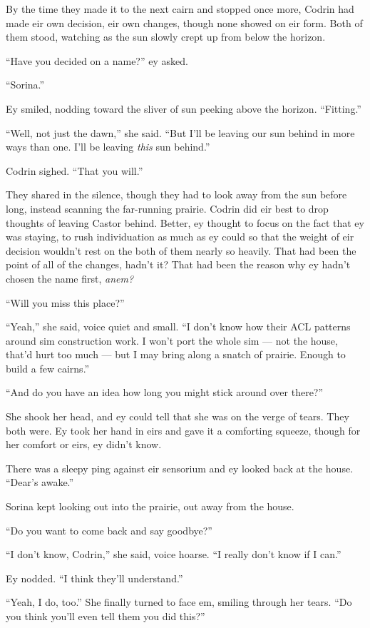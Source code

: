 By the time they made it to the next cairn and stopped once more, Codrin had made eir own decision, eir own changes, though none showed on eir form. Both of them stood, watching as the sun slowly crept up from below the horizon.

``Have you decided on a name?'' ey asked.

``Sorina.''

Ey smiled, nodding toward the sliver of sun peeking above the horizon. ``Fitting.''

``Well, not just the dawn,'' she said. ``But I'll be leaving our sun behind in more ways than one. I'll be leaving \emph{this} sun behind.''

Codrin sighed. ``That you will.''

They shared in the silence, though they had to look away from the sun before long, instead scanning the far-running prairie. Codrin did eir best to drop thoughts of leaving Castor behind. Better, ey thought to focus on the fact that ey was staying, to rush individuation as much as ey could so that the weight of eir decision wouldn't rest on the both of them nearly so heavily. That had been the point of all of the changes, hadn't it? That had been the reason why ey hadn't chosen the name first, \emph{anem?}

``Will you miss this place?''

``Yeah,'' she said, voice quiet and small. ``I don't know how their ACL patterns around sim construction work. I won't port the whole sim — not the house, that'd hurt too much — but I may bring along a snatch of prairie. Enough to build a few cairns.''

``And do you have an idea how long you might stick around over there?''

She shook her head, and ey could tell that she was on the verge of tears. They both were. Ey took her hand in eirs and gave it a comforting squeeze, though for her comfort or eirs, ey didn't know.

There was a sleepy ping against eir sensorium and ey looked back at the house. ``Dear's awake.''

Sorina kept looking out into the prairie, out away from the house.

``Do you want to come back and say goodbye?''

``I don't know, Codrin,'' she said, voice hoarse. ``I really don't know if I can.''

Ey nodded. ``I think they'll understand.''

``Yeah, I do, too.'' She finally turned to face em, smiling through her tears. ``Do you think you'll even tell them you did this?''

